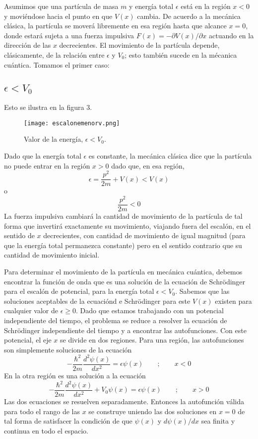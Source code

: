 \documentclass[12pt,a4paper]{article}
\def\e{{\epsilon}} %
\begin{document}
Asumimos que una partícula de masa $m$ y energía total $\e$ está en la región $x<0$ y moviéndose hacia el punto en que $V(x)$ cambia. De acuerdo a la mecánica clásica, la partícula se moverá libremente en esa región hasta que alcance $x=0$, donde estará sujeta a una fuerza impulsiva $F(x)=-\partial V(x)/\partial x$ actuando en la dirección de las $x$ decrecientes. El movimiento de la partícula depende, clásicamente, de la relación entre $\e$ y $V_{0}$; esto también sucede en la mécanica cuántica. Tomamos el primer caso:

\subsection{$\e < V_{0}$}

Esto se ilustra en la figura 3.

\begin{figure}[ht!]
\begin{center}
\texttt{[image: escalonemenorv.png]}
\caption{Valor de la energía, $\e<V_{0}$.}
\end{center}
\end{figure}

Dado que la energía total $\e$ es constante, la mecánica clásica dice que la partícula no puede entrar en la región $x>0$ dado que, en esa región,
\[ \e=\frac{p^{2}}{2m}+V(x) < V(x) \]
o
\[ \frac{p^{2}}{2m} < 0 \]
La fuerza impulsiva cambiará la cantidad de movimiento de la partícula de tal forma que invertirá exactamente su movimiento, viajando fuera del escalón, en el sentido de $x$ decrecientes, con cantidad de movimiento de igual magnitud (para que la energía total permanezca constante) pero en el sentido contrario que su cantidad de movimiento inicial.

Para determinar el movimiento de la partícula en mecánica cuántica, debemos encontrar la función de onda que es una solución de la ecuación de Schrödinger para el escalón de potencial, para la energía total $\e < V_{0}$. Sabemos que las soluciones aceptables de la ecuaciónd e Schrödinger para este $V(x)$ existen para cualquier valor de $\e \geq 0$. Dado que estamos trabajando con un potencial independiente del tiempo, el problema se reduce a resolver la ecuación de Schrödinger independiente del tiempo y a encontrar las autofunciones. Con este potencial, el eje $x$ se divide en dos regiones. Para una región, las autofunciones son simplemente soluciones de la ecuación
\[ -\frac{\hbar^{2}}{2m} \frac{d^{2} \psi (x)}{dx^{2}}=\e \psi (x) \qquad ; \qquad x<0 \]
En la otra región es una solución a la ecuación
\[ -\frac{\hbar^{2}}{2m} \frac{d^{2} \psi (x)}{dx^{2}}+V_{0} \psi (x)=\e \psi (x) \qquad ; \qquad x>0 \]
Las dos ecuaciones se resuelven separadamente. Entonces la autofunción válida para todo el rango de las $x$ se construye uniendo las dos soluciones en $x=0$ de tal forma de satisfacer la condición de que $\psi (x)$ y $d\psi(x)/dx$ sea finita y continua en todo el espacio.
\end{document}

